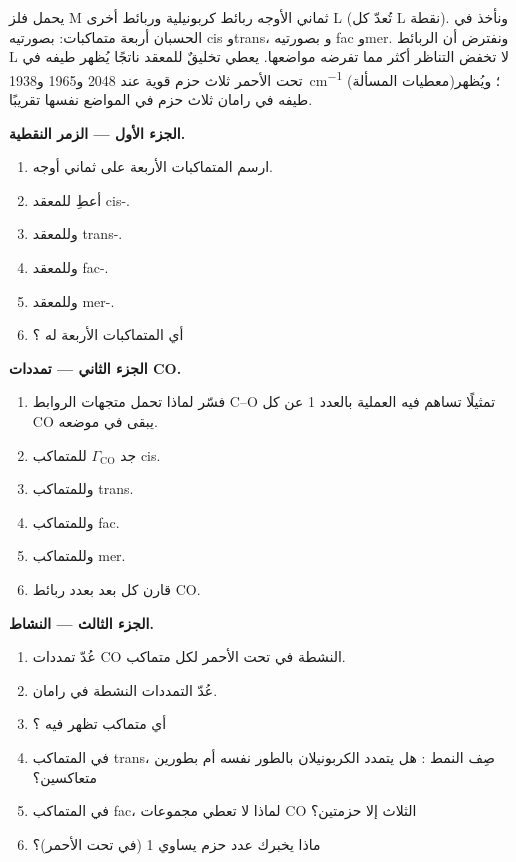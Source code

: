 \begin{problem}
\label{pb:b3:group-theory-applied:1}
يحمل فلز M ثماني الأوجه ربائط كربونيلية وربائط أخرى L (تُعدّ كل L
نقطة). ونأخذ في الحسبان أربعة متماكبات:  بصورتيه cis
وtrans، و بصورتيه fac وmer. ونفترض أن الربائط L لا
تخفض التناظر أكثر مما تفرضه مواضعها. يعطي تخليقٌ للمعقد
 ناتجًا يُظهر طيفه في تحت الأحمر ثلاث حزم قوية
عند 2048 و1965 و\qty{1938}{cm^{-1}} (معطيات المسألة)؛ ويُظهر طيفه في
رامان ثلاث حزم في المواضع نفسها تقريبًا.

\medskip\noindent\textbf{الجزء الأول --- الزمر النقطية.}
\begin{enumerate}
  \item ارسم المتماكبات الأربعة على ثماني أوجه.
  \item أعطِ  للمعقد cis-.
  \item وللمعقد trans-.
  \item وللمعقد fac-.
  \item وللمعقد mer-.
  \item أي المتماكبات الأربعة له ؟
\end{enumerate}

\medskip\noindent\textbf{الجزء الثاني --- تمددات CO.}
\begin{enumerate}[resume]
  \item فسّر لماذا تحمل متجهات الروابط C--O تمثيلًا تساهم فيه
        العملية بالعدد 1 عن كل CO يبقى في موضعه.
  \item جد $\Gamma_{\mathrm{CO}}$ للمتماكب cis.
  \item وللمتماكب trans.
  \item وللمتماكب fac.
  \item وللمتماكب mer.
  \item قارن كل بعد بعدد ربائط CO.
\end{enumerate}

\medskip\noindent\textbf{الجزء الثالث --- النشاط.}
\begin{enumerate}[resume]
  \item عُدّ تمددات CO النشطة في تحت الأحمر لكل متماكب.
  \item عُدّ التمددات النشطة في رامان.
  \item أي متماكب تظهر فيه ؟
  \item في المتماكب trans، صِف النمط : هل يتمدد
        الكربونيلان بالطور نفسه أم بطورين متعاكسين؟
  \item في المتماكب fac، لماذا لا تعطي مجموعات CO الثلاث إلا حزمتين؟
  \item ماذا يخبرك عدد حزم يساوي 1 (في تحت الأحمر)؟
\end{enumerate}


\end{problem}
